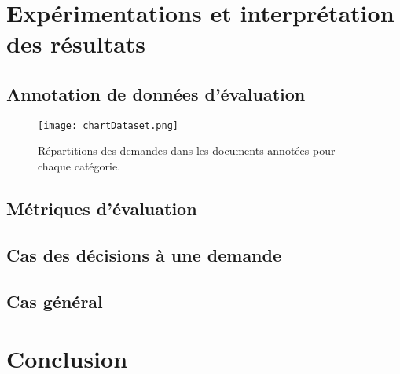 \section{Expérimentations et interprétation des résultats}
\label{sec:quanta:xp}

\subsection{Annotation de données d'évaluation}
\label{sec:quanta:xp:dataset}
\begin{figure}
\texttt{[image: chartDataset.png]}
\caption{Répartitions des demandes dans les documents annotées pour chaque catégorie.}\label{stat-alldata-dmd}
\end{figure}

\subsection{Métriques d'évaluation}
\label{sec:quanta:xp:metrics}

\subsection{Cas des décisions à une demande}

\subsection{Cas général}

\section{Conclusion}
\label{sec:quanta:conclusion}

